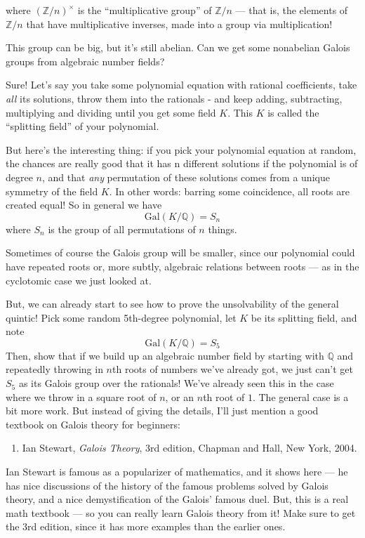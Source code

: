 \documentclass{article}
\def\tightlist{}
\begin{document}
where \((\mathbb{Z}/n)^\times\) is the ``multiplicative group'' of
\(\mathbb{Z}/n\) --- that is, the elements of \(\mathbb{Z}/n\) that have
multiplicative inverses, made into a group via multiplication!

This group can be big, but it's still abelian. Can we get some
nonabelian Galois groups from algebraic number fields?

Sure! Let's say you take some polynomial equation with rational
coefficients, take \emph{all} its solutions, throw them into the
rationals - and keep adding, subtracting, multiplying and dividing until
you get some field \(K\). This \(K\) is called the ``splitting field''
of your polynomial.

But here's the interesting thing: if you pick your polynomial equation
at random, the chances are really good that it has n different solutions
if the polynomial is of degree \(n\), and that \emph{any} permutation of
these solutions comes from a unique symmetry of the field \(K\). In
other words: barring some coincidence, all roots are created equal! So
in general we have \[\mathrm{Gal}(K/\mathbb{Q}) = S_n\] where \(S_n\) is
the group of all permutations of \(n\) things.

Sometimes of course the Galois group will be smaller, since our
polynomial could have repeated roots or, more subtly, algebraic
relations between roots --- as in the cyclotomic case we just looked at.

But, we can already start to see how to prove the unsolvability of the
general quintic! Pick some random 5th-degree polynomial, let \(K\) be
its splitting field, and note \[\mathrm{Gal}(K/\mathbb{Q}) = S_5\] Then,
show that if we build up an algebraic number field by starting with
\(\mathbb{Q}\) and repeatedly throwing in \(n\)th roots of numbers we've
already got, we just can't get \(S_5\) as its Galois group over the
rationals! We've already seen this in the case where we throw in a
square root of \(n\), or an \(n\)th root of \(1\). The general case is a
bit more work. But instead of giving the details, I'll just mention a
good textbook on Galois theory for beginners:

\begin{enumerate}
\def\labelenumi{\arabic{enumi})}
\tightlist
\item
  Ian Stewart, \emph{Galois Theory}, 3rd edition, Chapman and Hall, New
  York, 2004.
\end{enumerate}

Ian Stewart is famous as a popularizer of mathematics, and it shows here
--- he has nice discussions of the history of the famous problems solved
by Galois theory, and a nice demystification of the Galois' famous duel.
But, this is a real math textbook --- so you can really learn Galois
theory from it! Make sure to get the 3rd edition, since it has more
examples than the earlier ones.
\end{document}
